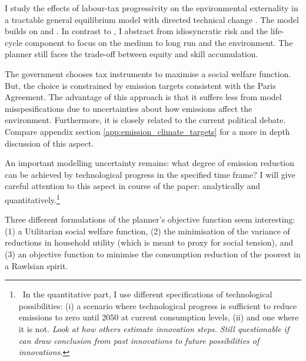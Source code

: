 I study the effects of labour-tax progressivity  on the environmental externality in a tractable general equilibrium model with directed technical change . The model builds on \cite{Heathcote2017OptimalFramework} and \cite{Acemoglu2012TheChange}.
In contrast to \cite{Heathcote2017OptimalFramework}, I abstract from idiosyncratic risk and the life-cycle component to focus on the medium to long run and the environment. 
The planner still faces the trade-off between equity and skill accumulation. 

The government chooses tax instruments to maximise a 
social welfare function. But, the choice is constrained by emission targets consistent with the Paris Agreement. The advantage of this approach is that it suffers less from  model misspesifications due to  uncertainties about how emissions affect the environment. Furthermore, it is closely related to the current political debate. Compare appendix section \ref{app:emission_climate_targets} for a more in depth discussion of this aspect.  


An important modelling uncertainty remains: what degree of emission reduction can be achieved by technological progress in the specified time frame? I will give careful attention to this aspect in course of the paper: analytically and quantitatively.\footnote{\ In the quantitative part, I use different specifications of technological possibilities: (i) a scenario where technological progress is sufficient to reduce emissions to zero until 2050 at current consumption levels, (ii) and one where it is not. \textit{ Look at how others estimate innovation steps. Still questionable if can draw conclusion from past innovations to future possibilities of innovations. }}


Three different formulations of the planner's objective function seem interesting: (1) a Utilitarian social welfare function, (2) the minimisation of the variance of reductions in household utility (which is meant to proxy for social tension), and (3) an objective function to minimise the consumption reduction of the poorest in a Rawlsian spirit. 


